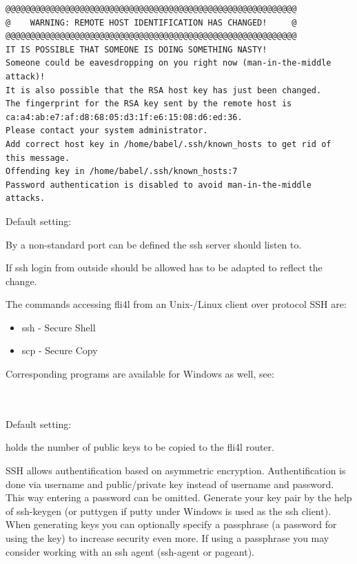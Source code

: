 \begin{description}
\begin{verbatim}
@@@@@@@@@@@@@@@@@@@@@@@@@@@@@@@@@@@@@@@@@@@@@@@@@@@@@@@@@@@
@    WARNING: REMOTE HOST IDENTIFICATION HAS CHANGED!     @
@@@@@@@@@@@@@@@@@@@@@@@@@@@@@@@@@@@@@@@@@@@@@@@@@@@@@@@@@@@
IT IS POSSIBLE THAT SOMEONE IS DOING SOMETHING NASTY!
Someone could be eavesdropping on you right now (man-in-the-middle attack)!
It is also possible that the RSA host key has just been changed.
The fingerprint for the RSA key sent by the remote host is
ca:a4:ab:e7:af:d8:68:05:d3:1f:e6:15:08:d6:ed:36.
Please contact your system administrator.
Add correct host key in /home/babel/.ssh/known_hosts to get rid of this message.
Offending key in /home/babel/.ssh/known_hosts:7
Password authentication is disabled to avoid man-in-the-middle attacks.
\end{verbatim}

 
   Default setting: 
 
   By  a non-standard port can be defined 
   the ssh server should listen to.
 
   If ssh login from outside should be allowed 
    has to be adapted 
   to reflect the change.
 
   The commands accessing fli4l from an Unix-/Linux client over protocol SSH 
   are:
   \begin{itemize}
   \item ssh - Secure Shell
   \item scp - Secure Copy
   \end{itemize}
 
   Corresponding programs are available for Windows as well, see: \\
     \\
     \\


  Default setting: 

   holds the number of public keys to be 
  copied to the fli4l router.

  SSH allows authentification based on asymmetric encryption. 
  Authentification is done via username and public/private key 
  instead of username and password. This way entering a password 
  can be omitted. Generate your key pair by the help of ssh-keygen 
  (or puttygen if putty under Windows is used as the ssh client). 
  When generating keys you can optionally specify a passphrase 
  (a password for using the key) to increase security even more. 
  If using a passphrase you may consider working with an ssh agent 
  (ssh-agent or pageant).


\end{description}
